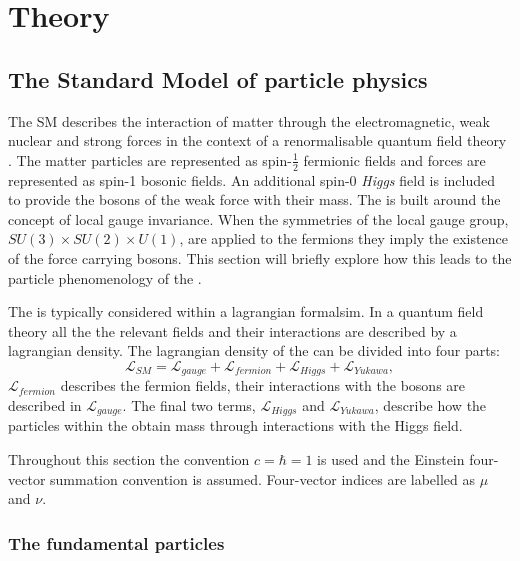 \chapter{Theory}
\label{chap:theory}


\section{The Standard Model of particle physics}
\label{sec:sm}

The \acf{SM} describes the interaction of matter through the
electromagnetic, weak nuclear and strong forces in the context of a
renormalisable quantum field theory
\cite{Salam:1964ry,Glashow:1961tr,PhysRevLett.19.1264}. The matter
particles are represented as spin-$\frac{1}{2}$ fermionic fields and
forces are represented as spin-1 bosonic fields. An additional spin-0
\emph{Higgs} field is included to provide the bosons of the weak force
with their mass. The \SM is built around the concept of local gauge
invariance. When the symmetries of the \SM local gauge group,
$SU(3)\times SU(2) \times U(1)$, are applied to the fermions they
imply the existence of the force carrying bosons. This section will
briefly explore how this leads to the particle phenomenology of the
\SM.

The \SM is typically considered within a lagrangian formalsim. In a
quantum field theory all the the relevant fields and their
interactions are described by a lagrangian density. The lagrangian
density of the \SM can be divided into four parts:
\begin{equation}
\mathcal{L}_{SM}=\mathcal{L}_{gauge}+\mathcal{L}_{fermion}+\mathcal{L}_{Higgs}+\mathcal{L}_{Yukawa},
\end{equation}
$\mathcal{L}_{fermion}$ describes the fermion
fields, their interactions with the bosons are described in
$\mathcal{L}_{gauge}$. The final two terms, $\mathcal{L}_{Higgs}$ and
$\mathcal{L}_{Yukawa}$, describe how the particles within the \SM
obtain mass through interactions with the Higgs field.

Throughout this section the convention $c=\hbar = 1$ is used and the
Einstein four-vector summation convention is assumed. Four-vector indices
are labelled as $\mu$ and $\nu$.

\subsection{The fundamental particles}

